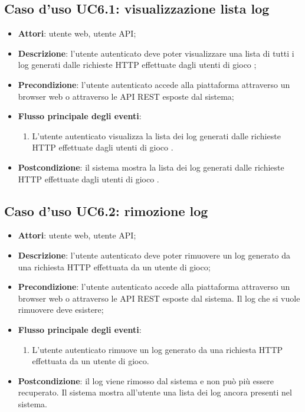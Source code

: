 \subsection{Caso d'uso UC6.1: visualizzazione lista log}
\begin{itemize}
\item \textbf{Attori}: utente web, utente API;
\item \textbf{Descrizione}: l'utente autenticato deve poter visualizzare una lista di tutti i log generati dalle richieste HTTP effettuate dagli utenti di gioco ; 
      \item \textbf{Precondizione}: l'utente autenticato accede alla piattaforma attraverso un browser web o attraverso le API REST esposte dal sistema;

        \item \textbf{Flusso principale degli eventi}:
          \begin{enumerate}
          \item L'utente autenticato visualizza la lista dei log generati dalle richieste HTTP effettuate dagli utenti di gioco .

      \end{enumerate}
    \item \textbf{Postcondizione}: il sistema mostra la lista dei log generati dalle richieste HTTP effettuate dagli utenti di gioco .
  \end{itemize}
\hypertarget{UC6.2}{}
\subsection{Caso d'uso UC6.2: rimozione log}
\begin{itemize}
\item \textbf{Attori}: utente web, utente API;
\item \textbf{Descrizione}: l'utente autenticato deve poter rimuovere un log generato da una richiesta HTTP effettuata da un utente di gioco; 
      \item \textbf{Precondizione}: l'utente autenticato accede alla piattaforma attraverso un browser web o attraverso le API REST esposte dal sistema. Il log che si vuole rimuovere deve esistere;

        \item \textbf{Flusso principale degli eventi}:
          \begin{enumerate}
          \item L'utente autenticato rimuove un log generato da una richiesta HTTP effettuata da un utente di gioco.

      \end{enumerate}
    \item \textbf{Postcondizione}: il log viene rimosso dal sistema e non può più essere recuperato. Il sistema mostra all'utente una lista dei log ancora presenti nel sistema.
  \end{itemize}
\hypertarget{UC6.3}{}
